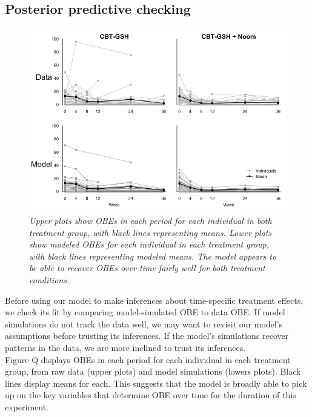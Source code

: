 \documentclass[12pt, oneside]{article}
\begin{document}
\subsection{Posterior predictive checking}

\begin{figure}
\centering
\includegraphics[width=\textwidth, height=\textheight, keepaspectratio]{ppc_sims.png}
\caption{\emph{Upper plots show OBEs in each period for each individual in both treatment group, with black lines representing means.  Lower plots show modeled OBEs for each individual in each treatment group, with black lines representing modeled means.  The model appears to be able to recover OBEs over time fairly well for both treatment conditions.}}
\end{figure}

Before using our model to make inferences about time-specific treatment effects, we check its fit by comparing model-simulated OBE to data OBE.  If model simulations do not track the data well, we may want to revisit our model's assumptions before trusting its inferences.  If the model's simulations recover patterns in the data, we are more inclined to trust its inferences.  
\\

Figure Q displays OBEs in each period for each individual in each treatment group, from raw data (upper plots) and model simulations (lowers plots).  Black lines display means for each.  This suggests that the model is broadly able to pick up on the key variables that determine OBE over time for the duration of this experiment.
\\
\end{document}
